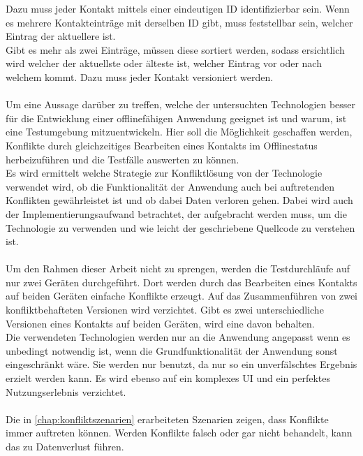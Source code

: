 Dazu muss jeder Kontakt mittels einer eindeutigen ID identifizierbar sein.
Wenn es mehrere Kontakteinträge mit derselben ID gibt, muss feststellbar sein, welcher Eintrag der aktuellere ist.\\
Gibt es mehr als zwei Einträge, müssen diese sortiert werden, sodass ersichtlich wird welcher der aktuellste oder älteste ist, welcher Eintrag vor oder nach welchem kommt. Dazu muss jeder Kontakt versioniert werden.\\\\
Um eine Aussage darüber zu treffen, welche der untersuchten Technologien besser für die Entwicklung einer offlinefähigen Anwendung geeignet ist und warum, ist eine Testumgebung mitzuentwickeln. Hier soll die Möglichkeit geschaffen werden, Konflikte durch gleichzeitiges Bearbeiten eines Kontakts im Offlinestatus herbeizuführen und die Testfälle auswerten zu können.\\
Es wird ermittelt welche Strategie zur Konfliktlösung von der Technologie verwendet wird, ob die Funktionalität der Anwendung auch bei auftretenden Konflikten gewährleistet ist und ob dabei Daten verloren gehen.
Dabei wird auch der Implementierungsaufwand betrachtet, der aufgebracht werden muss, um die Technologie zu verwenden und wie leicht der geschriebene Quellcode zu verstehen ist.\\\\
%
%
Um den Rahmen dieser Arbeit nicht zu sprengen, werden die Testdurchläufe auf nur zwei Geräten durchgeführt.
Dort werden durch das Bearbeiten eines Kontakts auf beiden Geräten einfache Konflikte erzeugt.
Auf das Zusammenführen von zwei konfliktbehafteten Versionen wird verzichtet.
Gibt es zwei unterschiedliche Versionen eines Kontakts auf beiden Geräten, wird eine davon behalten.\\
Die verwendeten Technologien werden nur an die Anwendung angepasst wenn es unbedingt notwendig ist, wenn die Grundfunktionalität der Anwendung sonst eingeschränkt wäre. Sie werden nur benutzt, da nur so ein unverfälschtes Ergebnis erzielt werden kann.
Es wird ebenso auf ein komplexes \gls{UI} und ein perfektes Nutzungserlebnis verzichtet.\\\\
%
%
Die in \autoref{chap:konfliktszenarien} erarbeiteten Szenarien zeigen, dass Konflikte immer auftreten können.
Werden Konflikte falsch oder gar nicht behandelt, kann das zu Datenverlust führen.
